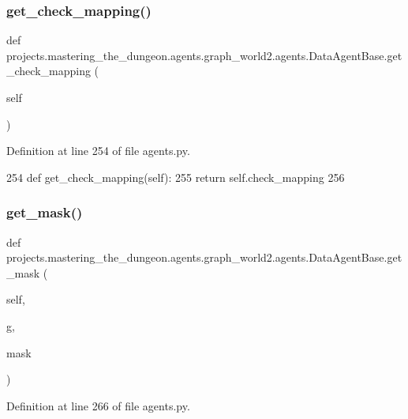 \subsubsection{\texorpdfstring{get\+\_\+check\+\_\+mapping()}{get\_check\_mapping()}}
{\footnotesize\ttfamily def projects.\+mastering\+\_\+the\+\_\+dungeon.\+agents.\+graph\+\_\+world2.\+agents.\+Data\+Agent\+Base.\+get\+\_\+check\+\_\+mapping (\begin{DoxyParamCaption}\item[{}]{self }\end{DoxyParamCaption})}



Definition at line 254 of file agents.\+py.


\begin{DoxyCode}
254     \textcolor{keyword}{def }get\_check\_mapping(self):
255         \textcolor{keywordflow}{return} self.check\_mapping
256 
\end{DoxyCode}
\mbox{\label{classprojects_1_1mastering__the__dungeon_1_1agents_1_1graph__world2_1_1agents_1_1DataAgentBase_ace568cdcf1e37545142584eb7e10d104}} 
\subsubsection{\texorpdfstring{get\+\_\+mask()}{get\_mask()}}
{\footnotesize\ttfamily def projects.\+mastering\+\_\+the\+\_\+dungeon.\+agents.\+graph\+\_\+world2.\+agents.\+Data\+Agent\+Base.\+get\+\_\+mask (\begin{DoxyParamCaption}\item[{}]{self,  }\item[{}]{g,  }\item[{}]{mask }\end{DoxyParamCaption})}



Definition at line 266 of file agents.\+py.


